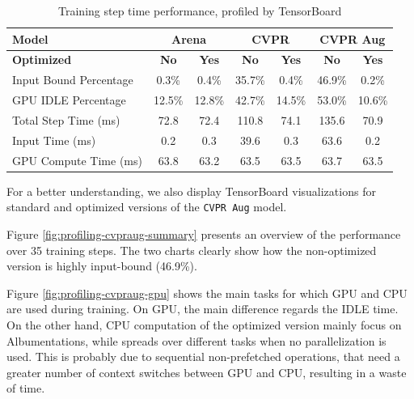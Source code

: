 \begin{table}[H]
	\caption{Training step time performance, profiled by TensorBoard}
	\label{tab:data-generator-profiling}
	\centering
	\begin{tabular}{|l|c|c||c|c||c|c|}
		\hline
		\textbf{Model} & \multicolumn{2}{|c||}{\textbf{Arena}} & \multicolumn{2}{|c||}{\textbf{CVPR}} & \multicolumn{2}{|c|}{\textbf{CVPR Aug}} \\
		\hline
		\textbf{Optimized} & \textbf{No} & \textbf{Yes} & \textbf{No} & \textbf{Yes} & \textbf{No} & \textbf{Yes} \\
		\hline
		Input Bound Percentage      &  0.3\% &  0.4\% & 35.7\% &  0.4\% & 46.9\% &  0.2\% \\
		GPU IDLE Percentage         & 12.5\% & 12.8\% & 42.7\% & 14.5\% & 53.0\% & 10.6\% \\
		\hline
		Total Step Time (ms)        &   72.8 &   72.4 &  110.8 &   74.1 &  135.6 &   70.9 \\
		Input Time (ms)             &    0.2 &    0.3 &   39.6 &    0.3 &   63.6 &    0.2 \\
		GPU Compute Time (ms)       &   63.8 &   63.2 &   63.5 &   63.5 &   63.7 &   63.5 \\
		\hline
		\hline
	\end{tabular}
\end{table}

For a better understanding, we also display TensorBoard visualizations for standard and optimized versions of the \texttt{CVPR Aug} model. 

Figure \ref{fig:profiling-cvpraug-summary} presents an overview of the performance over 35 training steps. The two charts clearly show how the non-optimized version is highly input-bound (46.9\%).

Figure \ref{fig:profiling-cvpraug-gpu} shows the main tasks for which GPU and CPU are used during training. On GPU, the main difference regards the IDLE time. On the other hand, CPU computation of the optimized version mainly focus on Albumentations, while spreads over different tasks when no parallelization is used. This is probably due to sequential non-prefetched operations, that need a greater number of context switches between GPU and CPU, resulting in a waste of time.


